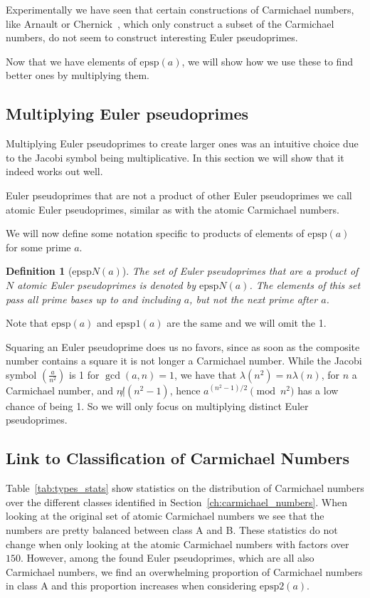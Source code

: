 \documentclass[runningheads]{amsart}
\newtheorem{definition}{Definition}
\newcommand{\epsp}{\mathrm{epsp}}
\begin{document}
Experimentally we have seen that certain constructions of Carmichael numbers,
like
Arnault\cite{Arnault1995}
or
Chernick~\cite{Chernick},
which only construct a subset of the Carmichael numbers,
do not seem to construct interesting Euler pseudoprimes.

Now that we have elements of
$\epsp(a)$,
we will show how we use these to find better ones by multiplying them.

\subsection{Multiplying Euler pseudoprimes}
Multiplying Euler pseudoprimes to create larger ones was an intuitive choice due to
the Jacobi symbol being multiplicative.
In this section we will show that it indeed works out well.

Euler pseudoprimes that are not a product of other Euler pseudoprimes we call atomic
Euler pseudoprimes,
similar as with the atomic Carmichael numbers.

We will now define some notation specific to products of elements of
$\epsp(a)$
for some prime $a$.

\begin{definition}[$\epsp N(a)$]
The set of Euler pseudoprimes that are a product of $N$ atomic Euler pseudoprimes
is denoted by
$\epsp
N(a)$.
The elements of this set pass all prime bases up to and including $a$,
but not the next prime after $a$.
\label{def: epspN}
\end{definition}
Note that
$\epsp(a)$
and
$\epsp1(a)$
are the same and we will omit the 1.

Squaring an Euler pseudoprime does us no favors,
since as soon as the composite number contains a square it is not longer a Carmichael
number.
While the Jacobi symbol
$\left(\frac{a}{n^2}\right)$
is 1 for
$\gcd(a,n)=1$,
we have that
$\lambda(n^2)
=
n\lambda(n)$,
for $n$ a Carmichael number,
and
$n\not|
(n^2
-1)$,
hence
$a^{(n^2-1)/2}
\pmod{n^2}$
has a low chance of being 1.
So we will only focus on multiplying distinct Euler pseudoprimes.
\relax

\subsection{Link to Classification of Carmichael Numbers}\label{sec:link}
Table~\ref{tab:types_stats}
show statistics on the distribution of Carmichael numbers over the different classes
identified in
Section~\ref{ch:carmichael_numbers}.
When looking at the original set of atomic Carmichael numbers we see that the numbers
are pretty balanced between class A and B.
These statistics do not change when only looking at the atomic Carmichael numbers
with factors over $150$.
However,
among the found Euler pseudoprimes,
which are all also Carmichael numbers,
we find an overwhelming proportion of Carmichael numbers in class A and this proportion
increases when considering
$\epsp2(a)$.
\end{document}
